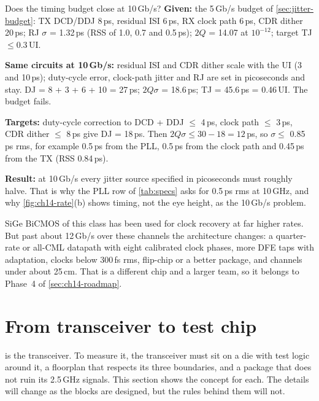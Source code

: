 \begin{example}{Does the timing budget close at 10\,Gb/s?}\label{we:ch14-10g}
\textbf{Given:} the 5\,Gb/s budget of \cref{sec:jitter-budget}: TX DCD/DDJ 8\,ps, residual ISI 6\,ps, RX clock path 6\,ps, CDR dither 20\,ps; RJ $\sigma$ = 1.32\,ps (RSS of 1.0, 0.7 and 0.5\,ps); $2Q$ = 14.07 at $10^{-12}$; target TJ $\le0.3$\,UI.

\textbf{Same circuits at 10\,Gb/s:} residual ISI and CDR dither scale with the UI (3 and 10\,ps); duty-cycle error, clock-path jitter and RJ are set in picoseconds and stay. DJ = 8 + 3 + 6 + 10 = 27\,ps; $2Q\sigma$ = 18.6\,ps; TJ = 45.6\,ps = 0.46\,UI. The budget fails.

\textbf{Targets:} duty-cycle correction to DCD + DDJ $\le$ 4\,ps, clock path $\le$ 3\,ps, CDR dither $\le$ 8\,ps give DJ = 18\,ps. Then $2Q\sigma \le 30 - 18 = 12$\,ps, so $\sigma\le$ 0.85\,ps rms, for example 0.5\,ps from the PLL, 0.5\,ps from the clock path and 0.45\,ps from the TX (RSS 0.84\,ps).

\textbf{Result:} at 10\,Gb/s every jitter source specified in picoseconds must roughly halve. That is why the PLL row of \cref{tab:specs} asks for 0.5\,ps rms at 10\,GHz, and why \cref{fig:ch14-rate}(b) shows timing, not the eye height, as the 10\,Gb/s problem.
\end{example}

\begin{insight}
SiGe BiCMOS of this class has been used for clock recovery at far higher rates. But past about 12\,Gb/s over these channels the architecture changes: a quarter-rate or all-CML datapath with eight calibrated clock phases, more DFE taps with adaptation, clocks below 300\,fs rms, flip-chip or a better package, and channels under about 25\,cm. That is a different chip and a larger team, so it belongs to Phase~4 of \cref{sec:ch14-roadmap}.
\end{insight}

\section{From transceiver to test chip}\label{sec:ch14-testchip}

 is the transceiver. To measure it, the transceiver must sit on a die with test logic around it, a floorplan that respects its three boundaries, and a package that does not ruin its 2.5\,GHz signals. This section shows the concept for each. The details will change as the blocks are designed, but the rules behind them will not.

